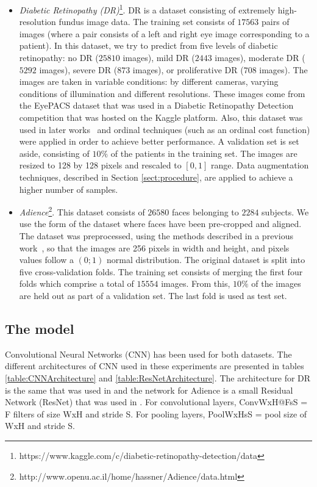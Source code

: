 \documentclass[journal]{IEEEtran}
\begin{document}
	\begin{itemize}
		\item \textit{Diabetic Retinopathy (DR)}\footnote{https://www.kaggle.com/c/diabetic-retinopathy-detection/data}. DR is a dataset consisting of extremely high-resolution fundus image data. The training set consists of $17563$ pairs of images (where a  pair consists of a left and right eye image corresponding to a patient). In this dataset, we try to predict from five levels of diabetic retinopathy: no DR ($25810$ images), mild DR ($2443$ images), moderate DR ($5292$ images), severe DR ($873$ images), or proliferative DR ($708$ images). The images are taken in variable conditions: by different cameras,  varying conditions of illumination and different resolutions. These images come from the EyePACS dataset that was used in a Diabetic Retinopathy Detection competition that was hosted on the Kaggle platform. Also, this dataset was used in later works~\cite{de2018weighted,nebot2016diabetic} and ordinal techniques (such as an ordinal cost function) were applied in order to achieve better performance. A validation set is set aside, consisting of $10\%$ of the patients in the training set. The images are resized to 128 by 128 pixels and rescaled to $[0,1]$ range. Data augmentation techniques, described in Section \ref{sect:procedure}, are applied to achieve a higher number of samples.
		
		\item \textit{Adience}\footnote{http://www.openu.ac.il/home/hassner/Adience/data.html}. This dataset consists of $26580$ faces belonging to $2284$ subjects. We use the form of the dataset where faces have been pre-cropped and aligned. The dataset was preprocessed, using the methods described in a previous work~\cite{beckham2017unimodal}, so that the images are 256 pixels in width and height, and pixels values follow a $(0;1)$ normal distribution. The original dataset is split into five cross-validation folds. The training set consists of merging the first four folds which comprise a total of $15554$ images. From this, $10\%$ of the images are held out as part of a validation set. The last fold is used as test set.
	\end{itemize}
	
	\subsection{The model}
	\label{sect:model}
	Convolutional Neural Networks (CNN) has been used for both datasets. The different architectures of CNN used in these experiments are presented in tables \ref{table:CNNArchitecture} and \ref{table:ResNetArchitecture}. The architecture for DR is the same that was used in \cite{de2018weighted} and the network for Adience is a small Residual Network (ResNet) \cite{he2016deep} that was used in \cite{beckham2017unimodal}. For convolutional layers, ConvWxH@FsS = F filters of size WxH and stride S. For pooling layers, PoolWxHsS = pool size of WxH and stride S.
	
\end{document}
